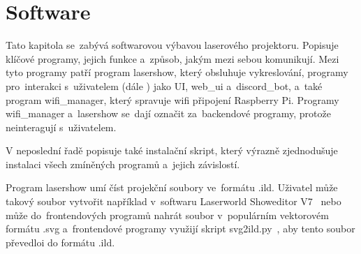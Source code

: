 \chapter{Software}

Tato kapitola se~zabývá softwarovou výbavou laserového projektoru. Popisuje klíčové programy, jejich funkce a~způsob, jakým mezi sebou komunikují.
Mezi tyto programy patří program lasershow, který obsluhuje vykreslování, programy pro~interakci s~uživatelem (dále ) jako UI, web\_ui a~discord\_bot, a~také program wifi\_manager, který spravuje wifi připojení Raspberry Pi.
Programy wifi\_manager a~lasershow se~dají označit za~backendové programy, protože neinteragují s~uživatelem.

V neposlední řadě popisuje také instalační skript, který výrazně zjednodušuje instalaci všech zmíněných programů a~jejich závislostí.

Program lasershow umí číst projekční soubory ve~formátu .ild.
Uživatel může takový soubor vytvořit například v~softwaru Laserworld Showeditor V7~\cite{showeditor} nebo může do~frontendových programů nahrát soubor v~populárním vektorovém formátu .svg a~frontendové programy využijí skript svg2ild.py~\cite{svg2ild}, aby tento soubor převedloi do formátu .ild.




